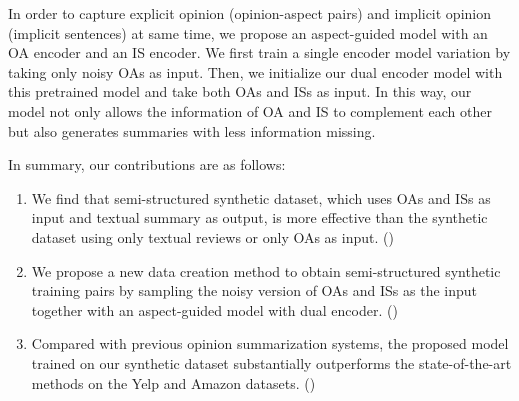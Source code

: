 In order to capture explicit opinion (opinion-aspect pairs) 
and implicit opinion (implicit sentences) at same time,
we propose an aspect-guided model with an OA encoder and
an IS encoder. %
We first train a single encoder model variation by taking only noisy OAs as input. 
Then, we initialize our dual encoder model with this pretrained model and take both OAs and ISs as input.
In this way, our model not only allows the information of OA and IS to 
complement each other but also generates summaries with less information missing.%

In summary, our contributions are as follows:
\begin{enumerate}
\item We find that semi-structured synthetic dataset,
which uses OAs and ISs as input 
and textual summary as output, 
is more effective than the synthetic dataset using only textual reviews or only OAs as input.
()

\item 
We propose a new data creation method to obtain
semi-structured synthetic training pairs by sampling the noisy version of 
OAs and ISs as the input together with an aspect-guided model with dual encoder. %
()

\item 
Compared with previous opinion summarization systems, 
the proposed model trained on our synthetic dataset substantially outperforms the 
state-of-the-art methods on the Yelp and Amazon datasets. ()
\end{enumerate}
